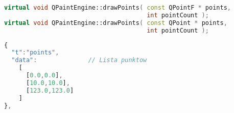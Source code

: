 
\begin{lstlisting}[language=C++,numbers=none]
virtual void QPaintEngine::drawPoints( const QPointF * points, 
                                       int pointCount );
virtual void QPaintEngine::drawPoints( const QPoint * points, 
                                       int pointCount );
\end{lstlisting}
\begin{lstlisting}[language=JavaScript,numbers=none]
{
  "t":"points",
  "data":              // Lista punktow
    [
      [0.0,0.0],
      [10.0,10.0],
      [123.0,123.0]
    ]
},
\end{lstlisting}